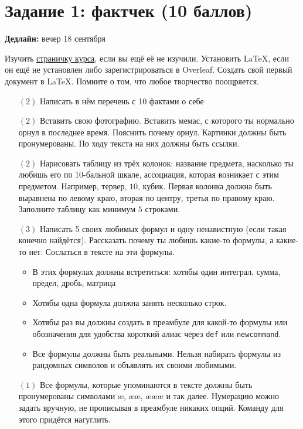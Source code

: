 \documentclass[12pt, a4paper, oneside]{article}
\begin{document}
\section*{Задание 1: фактчек  (10 баллов)}

\textbf{Дедлайн:} вечер 18 сентября

Изучить \href{https://github.com/FUlyankin/LaTeX}{страничку курса}, если вы ещё её не изучили. Установить LaTeX, если он ещё не установлен либо зарегистрироваться в Overleaf. Создать свой первый документ в LaTeX. Помните о том, что любое творчество поощряется. 


\begin{itemize}

\item [$(2)$] Написать в нём перечень с 10 фактами о себе

\item[$(2)$] Вставить свою фотографию.  Вставить мемас, с которого ты нормально орнул в последнее время. Пояснить почему орнул. Картинки должны быть пронумерованы. По ходу текста на них должны быть ссылки. 

\item[$(2)$] Нарисовать таблицу из трёх колонок: название предмета, насколько ты любишь его по 10-бальной шкале, ассоциация, которая возникает с этим предметом. Например, тервер, $10$, кубик. Первая колонка должна быть выравнена по левому краю, вторая по центру, третья по правому краю. Заполните таблицу как минимум $5$ строками.

\item[$(3)$] Написать 5 своих любимых формул и одну ненавистную (если такая конечно найдётся).  Рассказать почему ты любишь какие-то формулы, а какие-то нет. Сослаться в тексте на эти формулы. 

\begin{itemize}
	\item  В этих формулах должны встретиться:  хотябы один интеграл, сумма,  предел, дробь, матрица
	\item  Хотябы одна формула должна занять несколько строк. 
	\item  Хотябы раз вы должны создать в преамбуле для какой-то формулы или обозначения для удобства короткий алиас через \texttt{def} или \texttt{newcommand}.
	\item  Все формулы должны быть реальными. Нельзя набирать формулы из рандомных символов и объявлять их своими любимыми. 
\end{itemize}


\item[$(1)$] Все формулы, которые упоминаются в тексте должны быть пронумерованы символами æ, ææ, æææ и так далее. Нумерацию можно задать вручную, не прописывая в преамбуле никаких опций. Команду для этого придётся нагуглить. 
\end{itemize}
\end{document}
